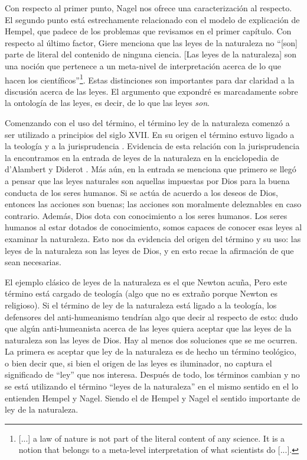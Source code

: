 Con respecto al primer punto, Nagel nos ofrece una caracterización al respecto. El segundo punto está estrechamente relacionado con el modelo de explicación de Hempel, que padece de los problemas que revisamos en el primer capítulo. Con respecto al último factor, Giere \citeyear[p. 69]{Giere2006} menciona que las leyes de la naturaleza no ``[son] parte de literal del contenido de ninguna ciencia. [Las leyes de la naturaleza] son una noción que pertenece a un meta-nivel de interpretación acerca de lo que hacen los científicos''\footnote{[...] a law of nature is not part of the literal content of any science. It is a notion that belongs to a meta-level interpretation of what scientists do [...].}. Estas distinciones son importantes para dar claridad a la discusión acerca de las leyes. El argumento que expondré es marcadamente sobre la ontología de las leyes, es decir, de lo que las leyes \textit{son}.

Comenzando con el uso del término, el término ley de la naturaleza comenzó a ser utilizado a principios del siglo XVII. En su origen el término estuvo ligado a la teología y a la jurisprudencia \cite{Giere2006, Giere1999}. Evidencia de esta relación con la jurisprudencia la encontramos en la entrada de leyes de la naturaleza en la enciclopedia de d'Alambert y Diderot \cite{lawna}. Más aún, en la entrada se menciona que primero se llegó a pensar que las leyes naturales son aquellas impuestas por Dios para la buena conducta de los seres humanos. Si se actúa de acuerdo a los deseos de Dios, entonces las acciones son buenas; las acciones son moralmente deleznables en caso contrario. Además, Dios dota con conocimiento a los seres humanos. Los seres humanos al estar dotados de conocimiento, somos capaces de conocer esas leyes al examinar la naturaleza. Esto nos da evidencia del origen del término y su uso: las leyes de  la naturaleza son las leyes de Dios, y en esto recae la afirmación de que sean necesarias.

El ejemplo clásico de leyes de la naturaleza es el que Newton acuña, Pero este término está cargado de teología (algo que no es extraño porque Newton es religioso). Si el término de ley de la naturaleza está ligado a la teología, los defensores del anti-humeanismo tendrían algo que decir al respecto de esto: dudo que algún anti-humeanista acerca de las leyes quiera aceptar que las leyes de la naturaleza son las leyes de Dios. Hay al menos dos soluciones que se me ocurren. La primera es aceptar que ley de la naturaleza es de hecho un término teológico, o bien decir que, si bien el origen de las leyes es iluminador, no captura el significado de ``ley'' que nos interesa. Después de todo, los términos cambian y no se está utilizando el término ``leyes de la naturaleza'' en el mismo sentido en el lo entienden Hempel y Nagel. Siendo el de Hempel y Nagel el sentido importante de ley de la naturaleza.


